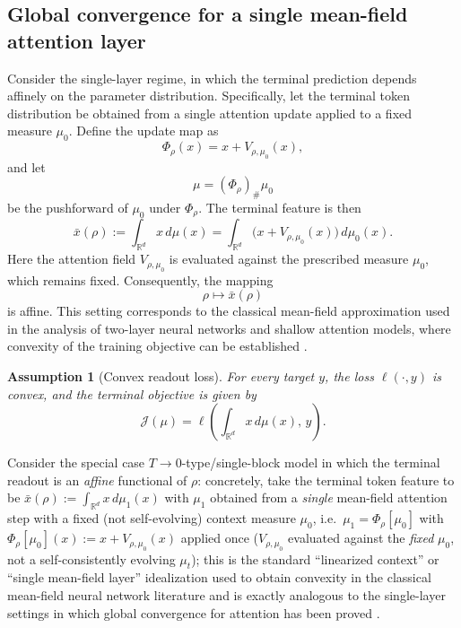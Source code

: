 \documentclass[11pt,a4wide]{article}
\newtheorem{assumption}{Assumption}
\theoremstyle{definition}
\newcommand{\R}{\mathbb{R}}
\begin{document}
\subsection{Global convergence for a single mean-field attention layer}

Consider the single-layer  regime, in which the terminal prediction depends affinely on the parameter distribution.  Specifically, let the terminal token distribution be obtained from a single
attention update applied to a fixed  measure $\mu_0$. Define the update
map as
\[
\Phi_\rho(x)
=
x+V_{\rho,\mu_0}(x),
\]
and let
\[
\mu
=
(\Phi_\rho)_\#\mu_0
\]
be the pushforward of $\mu_0$ under $\Phi_\rho$. The terminal feature is then
\[
\bar x(\rho)
:=
\int_{\mathbb R^d}x\,d\mu(x)
=
\int_{\mathbb R^d}
\bigl(x+V_{\rho,\mu_0}(x)\bigr)\,
d\mu_0(x).
\]
Here the attention field $V_{\rho,\mu_0}$ is evaluated against the prescribed
 measure $\mu_0$, which remains fixed. Consequently, the mapping
\[
\rho\longmapsto\bar x(\rho)
\]
is affine. This setting corresponds to the classical mean-field approximation used in the analysis of two-layer neural networks and shallow attention models, where convexity of the training objective can be established
\cite{mei2018meanfield,chizat2018global,song2024unraveling,zhang2024transformers}.

\begin{assumption}[Convex readout loss]
\label{ass:convex}
For every target $y$, the loss $\ell(\cdot,y)$ is convex, and the terminal objective is given by
\[
\mathcal J(\mu)
=
\ell\!\left(
\int_{\mathbb R^d}x\,d\mu(x),
\,y
\right).
\]
\end{assumption}
\iffalse 

Consider the special case $T\to0$-type/single-block model in which the terminal readout is an \emph{affine} functional of $\rho$: concretely, take the terminal token feature to be $\bar x(\rho) := \int_{\R^d} x\,d\mu_1(x)$ with $\mu_1$ obtained from a \emph{single} mean-field attention step with a fixed (not self-evolving) context measure $\mu_0$, i.e.\ $\mu_1 = \Phi_\rho[\mu_0]$ with $\Phi_\rho[\mu_0](x) := x + V_{\rho,\mu_0}(x)$ applied once ($V_{\rho,\mu_0}$ evaluated against the \emph{fixed} $\mu_0$, not a self-consistently evolving $\mu_t$); this is the standard ``linearized context'' or ``single mean-field layer'' idealization used to obtain convexity in the classical mean-field neural network literature \cite{mei2018meanfield,chizat2018global} and is exactly analogous to the single-layer settings in which global convergence for attention has been proved \cite{song2024unraveling,zhang2024transformers}.
\end{document}

